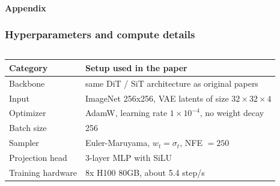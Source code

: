 \begin{frame}[t]
  \framesubtitle{Appendix}
  \frametitle{Hyperparameters and compute details}
  \begin{columns}[T,totalwidth=\textwidth]
    \begin{tabular}{L{2.8cm}L{3.8cm}}
      \toprule
      Category & Setup used in the paper \\
      \midrule
      Backbone & same DiT / SiT architecture as original papers \\
      Input & ImageNet 256x256, VAE latents of size \(32\times32\times4\) \\
      Optimizer & AdamW, learning rate \(1\times 10^{-4}\), no weight decay \\
      Batch size & 256 \\
      Sampler & Euler-Maruyama, \(w_t=\sigma_t\), NFE \(=250\) \\
      Projection head & 3-layer MLP with SiLU \\
      Training hardware & 8x H100 80GB, about 5.4 step/s \\
      \bottomrule
    \end{tabular}
  \end{columns}
\end{frame}

